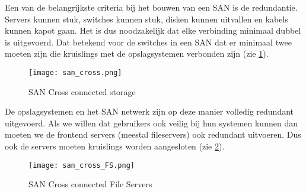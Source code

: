 Een van de belangrijkste criteria bij het bouwen van een SAN is de redundantie. Servers kunnen stuk, switches kunnen stuk, disken kunnen uitvallen en kabels kunnen kapot gaan. Het is dus noodzakelijk dat elke verbinding minimaal dubbel is uitgevoerd. Dat betekend voor de switches in een SAN dat er minimaal twee moeten zijn die kruislings met de opslagsystemen verbonden zijn (zie \ref{SAN_cross}).

\begin{figure}[h!]
	\texttt{[image: san\_cross.png]}
	\caption{SAN Cross connected storage}
	\label{SAN_cross}
\end{figure}

De opslagsystemen en het SAN netwerk zijn op deze manier volledig redundant uitgevoerd. Als we willen dat gebruikers ook veilig bij hun systemen kunnen dan moeten we de frontend servers (meestal fileservers) ook redundant uitvoeren. Dus ook de servers moeten kruislings worden aangesloten (zie \ref{SAN_cross_FS}).

\begin{figure}[h!]
	\texttt{[image: san\_cross\_FS.png]}
	\caption{SAN Cross connected File Servers}
	\label{SAN_cross_FS}
\end{figure}


